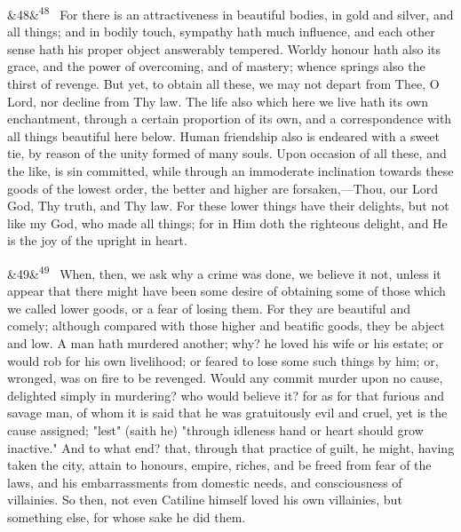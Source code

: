 \documentclass[12pt]{article}
\newcommand{\para}[1][]{\par\noindent\ifx&#1&\else\textsuperscript{\footnotesize #1}~\fi}
\begin{document}
\para[48] For there is an attractiveness in beautiful bodies, in gold and silver, and all things; and in bodily touch, sympathy hath much influence, and each other sense hath his proper object answerably tempered. Worldy honour hath also its grace, and the power of overcoming, and of mastery; whence springs also the thirst of revenge. But yet, to obtain all these, we may not depart from Thee, O Lord, nor decline from Thy law. The life also which here we live hath its own enchantment, through a certain proportion of its own, and a correspondence with all things beautiful here below. Human friendship also is endeared with a sweet tie, by reason of the unity formed of many souls. Upon occasion of all these, and the like, is sin committed, while through an immoderate inclination towards these goods of the lowest order, the better and higher are forsaken,---Thou, our Lord God, Thy truth, and Thy law. For these lower things have their delights, but not like my God, who made all things; for in Him doth the righteous delight, and He is the joy of the upright in heart.

\para[49] When, then, we ask why a crime was done, we believe it not, unless it appear that there might have been some desire of obtaining some of those which we called lower goods, or a fear of losing them. For they are beautiful and comely; although compared with those higher and beatific goods, they be abject and low. A man hath murdered another; why? he loved his wife or his estate; or would rob for his own livelihood; or feared to lose some such things by him; or, wronged, was on fire to be revenged. Would any commit murder upon no cause, delighted simply in murdering? who would believe it? for as for that furious and savage man, of whom it is said that he was gratuitously evil and cruel, yet is the cause assigned; "lest" (saith he) "through idleness hand or heart should grow inactive." And to what end? that, through that practice of guilt, he might, having taken the city, attain to honours, empire, riches, and be freed from fear of the laws, and his embarrassments from domestic needs, and consciousness of villainies. So then, not even Catiline himself loved his own villainies, but something else, for whose sake he did them.
\end{document}
